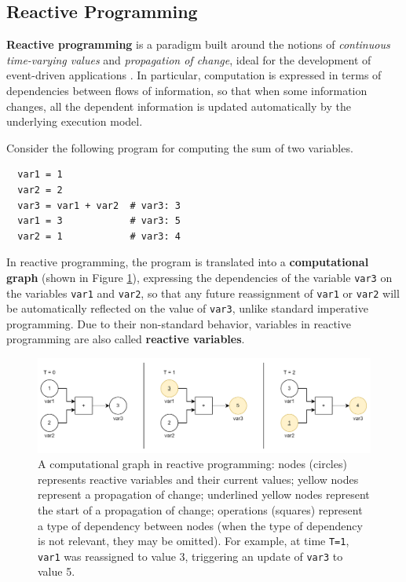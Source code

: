 
\subsection{Reactive Programming}

\textbf{Reactive programming} is a paradigm built around the notions of
\textit{continuous time-varying values} and \textit{propagation of change},
ideal for the development of event-driven applications
\cite{ReactiveProgramming}. In particular, computation is expressed in terms of
dependencies between flows of information, so that when some information
changes, all the dependent information is updated automatically by the
underlying execution model.

Consider the following program for computing the sum of two variables.

\begin{lstlisting}
  var1 = 1
  var2 = 2
  var3 = var1 + var2  # var3: 3
  var1 = 3            # var3: 5
  var2 = 1            # var3: 4
\end{lstlisting}

In reactive programming, the program is translated into a \textbf{computational
graph} (shown in Figure \ref{figure:dependency-graph}), expressing the
dependencies of the variable \texttt{var3} on the variables \texttt{var1} and
\texttt{var2}, so that any future reassignment of \texttt{var1} or
\texttt{var2} will be automatically reflected on the value of \texttt{var3},
unlike standard imperative programming. Due to their non-standard behavior,
variables in reactive programming are also called \textbf{reactive variables}.

\begin{figure}[h]
  \centering
  \includegraphics[width=\textwidth]{resources/figures/dependency-graph.png}
  \caption{
    A computational graph in reactive programming: nodes (circles) represents
    reactive variables and their current values; yellow nodes represent a
    propagation of change; underlined yellow nodes represent the
    start of a propagation of change; operations (squares) represent a type
    of dependency between nodes (when the type of dependency is not relevant,
    they may be omitted). For example, at time \texttt{T=1}, \texttt{var1} was
    reassigned to value 3, triggering an update of \texttt{var3} to value 5.
  }
  \label{figure:dependency-graph}
\end{figure}

